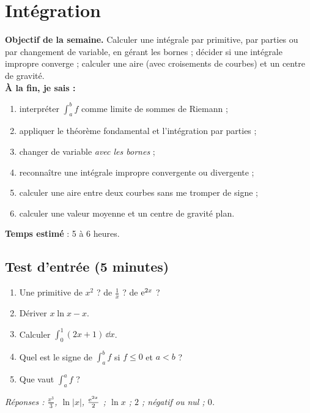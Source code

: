 \clearpage
\section{Intégration}
\renewcommand{\titrecourant}{Semaine 4}

\begin{boussole}
\textbf{Objectif de la semaine.} Calculer une intégrale par primitive, par parties ou par changement de variable, en gérant les bornes ; décider si une intégrale impropre converge ; calculer une aire (avec croisements de courbes) et un centre de gravité.\\
\textbf{À la fin, je sais :}
\begin{enumerate}
 \item interpréter $\int_a^bf$ comme limite de sommes de Riemann ;
 \item appliquer le théorème fondamental et l'intégration par parties ;
 \item changer de variable \emph{avec les bornes} ;
 \item reconnaître une intégrale impropre convergente ou divergente ;
 \item calculer une aire entre deux courbes sans me tromper de signe ;
 \item calculer une valeur moyenne et un centre de gravité plan.
\end{enumerate}
\textbf{Temps estimé} : 5 à 6 heures.
\end{boussole}

\subsection{Test d'entrée (5 minutes)}
\begin{enumerate}
 \item Une primitive de $x^2$ ? de $\frac1x$ ? de $\mathrm{e}^{2x}$ ?
 \item Dériver $x\ln x-x$.
 \item Calculer $\int_0^1(2x+1)\,\dd x$.
 \item Quel est le signe de $\int_a^bf$ si $f\le0$ et $a<b$ ?
 \item Que vaut $\int_a^af$ ?
\end{enumerate}
\textit{Réponses : $\frac{x^3}3$, $\ln|x|$, $\frac{\mathrm{e}^{2x}}2$ ; $\ln x$ ; $2$ ; négatif ou nul ; $0$.}

